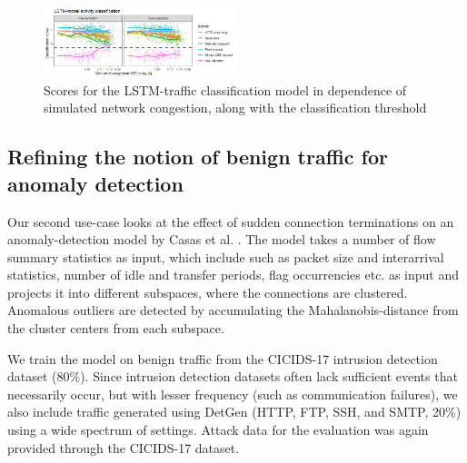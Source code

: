 \documentclass[sigconf]{acmart}
\begin{document}

\begin{figure}
\centering
\includegraphics[width=0.5\textwidth]{images/LSTM_exp.png}
\caption{Scores for the LSTM-traffic classification model in dependence of simulated network congestion, along with the classification threshold}\label{fig:LSTM_exp}
\end{figure}

\subsection{Refining the notion of benign traffic for anomaly detection}

Our second use-case looks at the effect of sudden connection terminations on an anomaly-detection model by Casas et al. \cite{casas2012unsupervised}. The model takes a number of flow summary statistics as input, which include such as packet size and interarrival statistics, number of idle and transfer periods, flag occurrencies etc. as input and projects it into different subspaces, where the connections are clustered. Anomalous outliers are detected by accumulating the Mahalanobis-distance from the cluster centers from each subspace.

We train the model on benign traffic from the CICIDS-17 intrusion detection dataset (80\%). Since intrusion detection datasets often lack sufficient events that necessarily occur, but with lesser frequency (such as communication failures), we also include traffic generated using DetGen (HTTP, FTP, SSH, and SMTP, 20\%) using a wide spectrum of settings. Attack data for the evaluation was again provided through the CICIDS-17 dataset.
\end{document}
